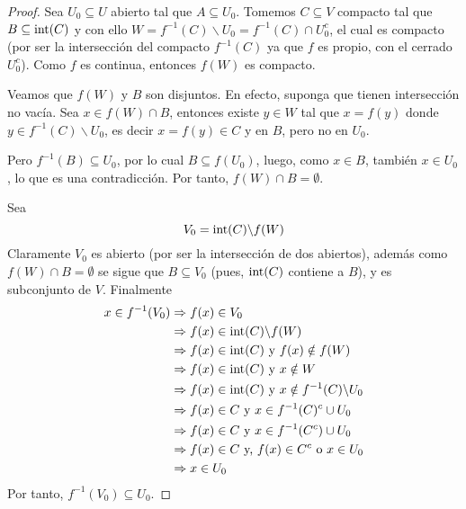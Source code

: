 \documentclass[12pt]{report}
\theoremstyle{largebreak}
\begin{document}
\begin{proof}
    Sea $U_0\subseteq U$ abierto tal que $A\subseteq U_0$. Tomemos $C\subseteq V$ compacto tal que $B\subseteq \textup{int}(C)$ y con ello $W=f^{-1}(C)\backslash U_0=f^{-1}(C)\cap U_0^c$, el cual es compacto (por ser la intersección del compacto $f^{-1}(C)$ ya que $f$ es propio, con el cerrado $U_0^c$). Como $f$ es continua, entonces $f(W)$ es compacto.
    
    Veamos que $f(W)$ y $B$ son disjuntos. En efecto, suponga que tienen intersección no vacía. Sea $x\in f(W)\cap B$, entonces existe $y\in W$ tal que $x=f(y)$ donde $y\in f^{-1}(C)\backslash U_0$, es decir $x=f(y)\in C$ y en $B$, pero no en $U_0$.

    Pero $f^{-1}(B)\subseteq U_0$, por lo cual $B\subseteq f(U_0)$, luego, como $x\in B$, también $x\in U_0$, lo que es una contradicción. Por tanto, $f(W)\cap B=\emptyset$.
    
    Sea
    \begin{equation*}
        V_0=\textup{int}(C)\backslash f(W)
    \end{equation*}
    Claramente $V_0$ es abierto (por ser la intersección de dos abiertos), además como $f(W)\cap B=\emptyset$ se sigue que $B\subseteq V_0$ (pues, $\textup{int}(C)$ contiene a $B$), y es subconjunto de $V$. Finalmente
    \begin{equation*}
        \begin{split}
            x\in f^{-1}(V_0)&\Rightarrow f(x)\in V_0\\
            &\Rightarrow f(x)\in \textup{int}(C)\backslash f(W)\\
            &\Rightarrow f(x)\in \textup{int}(C)\textup{ y } f(x)\notin f(W)\\
            &\Rightarrow f(x)\in \textup{int}(C)\textup{ y } x\notin W\\
            &\Rightarrow f(x)\in \textup{int}(C)\textup{ y } x\notin f^{-1}(C)\backslash U_0\\
            &\Rightarrow f(x)\in C\textup{ y } x\in f^{-1}(C)^c\cup U_0\\
            &\Rightarrow f(x)\in C\textup{ y } x\in f^{-1}(C^c)\cup U_0\\
            &\Rightarrow f(x)\in C\textup{ y, } f(x)\in C^c\textup{ o }x\in U_0\\
            &\Rightarrow x\in U_0\\
        \end{split}
    \end{equation*}
    Por tanto, $f^{-1}(V_0)\subseteq U_0$.
\end{proof}
\end{document}
